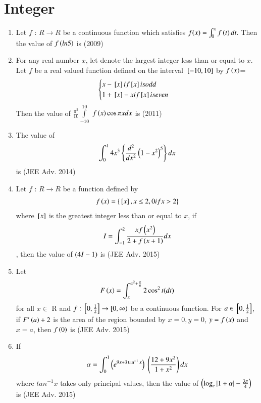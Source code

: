 \documentclass[journal,12pt,onecolumn]{IEEEtran}
\theoremstyle{remark}
\begin{document}
\section{Integer}
\begin{enumerate}

\item Let $f$ : $R\rightarrow R$ be a continuous function which 
 satisfies $f(x)=\int_{0}^{x}f\left(t\right)dt.$ Then the value of $f\left(ln5\right)$ is \hfill{(2009)}
  
         \item For any real number $x$, let  denote the largest integer less than or equal to $x$. Let $f$ be a real valued function defined on the interval ${}\left[-10,10\right]$ by
		 $f\left(x\right)$= \[\begin{cases}  x-{}\left[x\right] if {}\left[x\right] is odd \\ 1+{}\left[x\right]-x if {}\left[x\right] is even \end{cases}\]
  Then the value of $\frac{{\pi}^{2}}{10}\int\limits_{-10}^{10}$ $f\left(x\right)\cos\pi xdx$ is \hfill{(2011)}


         \item The value of 
		 \begin{align}
			 \int_{0}^{1} 4x^3 \left\{\frac{d^2}{dx^2}\left(1-x^2\right)^5 \right\}dx 
		 \end{align}
		 is \hfill{(JEE Adv. 2014)}

  \item Let $f$ : $R \rightarrow R$ be a function defined by
	  \begin{align}
		  f\left(x\right)=\left\{{}\left[x\right],x \leq2, 0 if x>2 \right\}
	  \end{align}
  where ${}\left[x\right]$ is the greatest integer less than or equal to $x$, if 
  \[ I=\int_{-1}^{2} \frac{xf\left(x^2\right)}{2+f\left(x+1\right)}dx \],
		then the value of $\left(4I-1\right)$ is \hfill{(JEE Adv. 2015)}  

\item Let 
	\begin{align}
		F\left(x\right)=\int_{x}^{x^2 +\frac{\pi}{6}} 2\cos^2t(dt)
	\end{align}
 for all $x \in$ R and $f:{}\left[0,\frac{1}{2}\right]\rightarrow[0,\infty)$ be a continuous function. For $a \in{}\left[0,\frac{1}{2}\right]$, if $F^\prime\left(a\right)+2$ is the area of the region bounded by $x=0, y=0$, $y=f\left(x\right)$ and $x=a$, then $f\left(0\right)$ is   \hfill{(JEE Adv. 2015)}

\item If 
	\begin{align}
		\alpha=\int_{0}^{1}\left(e^{9x+3\tan^{-1}x} \right) \ \left( \frac{12+9x^2}{1+x^2}\right)dx
	\end{align}
		where $tan^{-1}x$ takes only principal values,
 then the value of $\left(\log_e |1+\alpha|-\frac{3\pi}{4}\right)$ is  \hfill{(JEE Adv. 2015)}


\end{enumerate}
\end{document}
